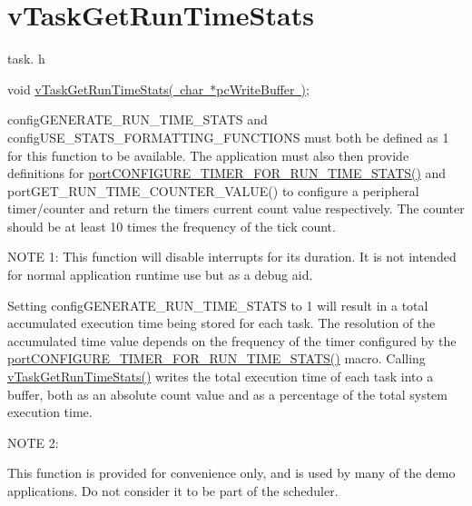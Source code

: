\hypertarget{group__v_task_get_run_time_stats}{}\section{v\+Task\+Get\+Run\+Time\+Stats}
\label{group__v_task_get_run_time_stats}
task. h 
\begin{DoxyPre}void \mbox{\hyperlink{task_8h_a52da9b427041a48dc9f6802e10f151d4}{vTaskGetRunTimeStats( char *pcWriteBuffer )}};\end{DoxyPre}


config\+G\+E\+N\+E\+R\+A\+T\+E\+\_\+\+R\+U\+N\+\_\+\+T\+I\+M\+E\+\_\+\+S\+T\+A\+TS and config\+U\+S\+E\+\_\+\+S\+T\+A\+T\+S\+\_\+\+F\+O\+R\+M\+A\+T\+T\+I\+N\+G\+\_\+\+F\+U\+N\+C\+T\+I\+O\+NS must both be defined as 1 for this function to be available. The application must also then provide definitions for \mbox{\hyperlink{_free_r_t_o_s_8h_a727939bcdb98501e0eba0ec8a1841e1b}{port\+C\+O\+N\+F\+I\+G\+U\+R\+E\+\_\+\+T\+I\+M\+E\+R\+\_\+\+F\+O\+R\+\_\+\+R\+U\+N\+\_\+\+T\+I\+M\+E\+\_\+\+S\+T\+A\+T\+S()}} and port\+G\+E\+T\+\_\+\+R\+U\+N\+\_\+\+T\+I\+M\+E\+\_\+\+C\+O\+U\+N\+T\+E\+R\+\_\+\+V\+A\+L\+U\+E() to configure a peripheral timer/counter and return the timers current count value respectively. The counter should be at least 10 times the frequency of the tick count.

N\+O\+TE 1\+: This function will disable interrupts for its duration. It is not intended for normal application runtime use but as a debug aid.

Setting config\+G\+E\+N\+E\+R\+A\+T\+E\+\_\+\+R\+U\+N\+\_\+\+T\+I\+M\+E\+\_\+\+S\+T\+A\+TS to 1 will result in a total accumulated execution time being stored for each task. The resolution of the accumulated time value depends on the frequency of the timer configured by the \mbox{\hyperlink{_free_r_t_o_s_8h_a727939bcdb98501e0eba0ec8a1841e1b}{port\+C\+O\+N\+F\+I\+G\+U\+R\+E\+\_\+\+T\+I\+M\+E\+R\+\_\+\+F\+O\+R\+\_\+\+R\+U\+N\+\_\+\+T\+I\+M\+E\+\_\+\+S\+T\+A\+T\+S()}} macro. Calling \mbox{\hyperlink{task_8h_a52da9b427041a48dc9f6802e10f151d4}{v\+Task\+Get\+Run\+Time\+Stats()}} writes the total execution time of each task into a buffer, both as an absolute count value and as a percentage of the total system execution time.

N\+O\+TE 2\+:

This function is provided for convenience only, and is used by many of the demo applications. Do not consider it to be part of the scheduler.

